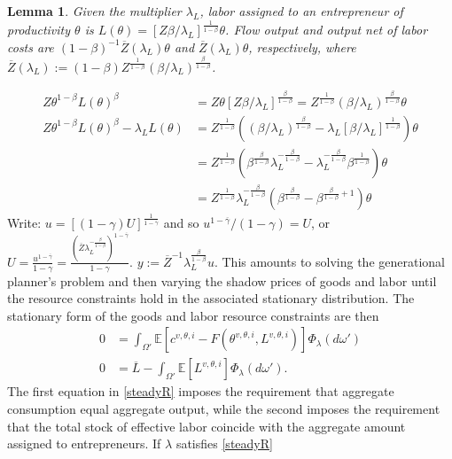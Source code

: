 \documentclass[11pt]{article}
\theoremstyle{plain}
\newtheorem{lemma}[thm]{Lemma}
\begin{document}
\begin{lemma} \label{STATlemma}
Given the multiplier $\lambda_L$, labor assigned to an entrepreneur of productivity $\theta$ is $L(\theta) = [Z\beta/\lambda_L]^{\frac{1}{1-\beta}} \theta$. Flow output and output net of labor costs are $(1-\beta)^{-1}\overline{Z}(\lambda_L)  \theta$ and $\overline{Z}(\lambda_L) \theta$, respectively, where $\overline{Z}(\lambda_L) := (1-\beta)Z^{\frac{1}{1-\beta}}(\beta/\lambda_L)^{\frac{\beta}{1-\beta}}$.
\end{lemma}

\iffalse
\begin{align*}
Z\theta^{1-\beta}L(\theta)^{\beta} & = Z\theta   [Z\beta/\lambda_L]^{\frac{\beta}{1-\beta}}  = Z^{\frac{1}{1-\beta}}(\beta/\lambda_L)^{\frac{\beta}{1-\beta}} \theta
\\ Z\theta^{1-\beta}L(\theta)^{\beta} - \lambda_LL(\theta) & = Z^{\frac{1}{1-\beta}}((\beta/\lambda_L)^{\frac{\beta}{1-\beta}} - \lambda_L[\beta/\lambda_L]^{\frac{1}{1-\beta}})\theta
\\ & = Z^{\frac{1}{1-\beta}}(\beta^{\frac{\beta}{1-\beta}}\lambda_L^{-\frac{\beta}{1-\beta}} - \lambda_L^{-\frac{\beta}{1-\beta}}\beta^{\frac{1}{1-\beta}} )\theta
\\ & = Z^{\frac{1}{1-\beta}}\lambda_L^{-\frac{\beta}{1-\beta}}(\beta^{\frac{\beta}{1-\beta}} - \beta^{\frac{\beta}{1-\beta}+1} )\theta
\end{align*}
Write: $u = [(1-\gamma)U]^{\frac{1}{1-\overline{\gamma}}}$ and so $u^{1-\overline{\gamma}}/(1-\gamma) = U$, or $U = \frac{u^{1-\overline{\gamma}}}{1-\gamma} = \frac{(\overline{Z}\lambda_L^{-\frac{\beta}{1-\beta}})^{1-\overline{\gamma}}}{1-\gamma}$. $y := \overline{Z}^{-1}\lambda_L^{\frac{\beta}{1-\beta}}u$. 
This amounts to solving the generational planner's problem and then varying the shadow prices of goods and labor until the resource constraints hold in the associated stationary distribution. 
The stationary form of the goods and labor resource constraints are then
\begin{equation}
\begin{aligned}
0 & = \int_{\Omega'}\mathbb{E}[c^{v,\theta,i} - F(\theta^{v,\theta,i},L^{v,\theta,i})]\Phi_{\lambda}(d\omega')
\\ 0 & = \overline{L} - \int_{\Omega'}\mathbb{E}[L^{v,\theta,i}]\Phi_{\lambda}(d\omega').
\label{steadyR}
\end{aligned}
\end{equation}
The first equation in \eqref{steadyR} imposes the requirement that aggregate consumption equal aggregate output, while the second imposes the requirement that the total stock of effective labor coincide with the aggregate amount assigned to entrepreneurs. If $\lambda$ satisfies \eqref{steadyR}
\end{document}
